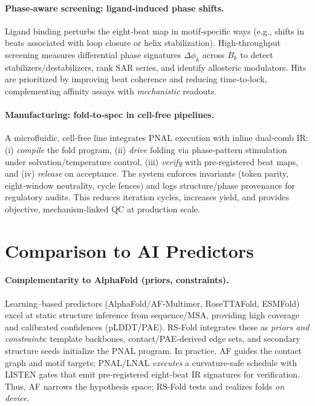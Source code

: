 \documentclass[12pt,a4paper]{article}
\begin{document}
\paragraph{Phase‑aware screening: ligand‑induced phase shifts.}
Ligand binding perturbs the eight‑beat map in motif‑specific ways (e.g., shifts in beats associated with loop closure or helix stabilization). High‑throughput screening measures differential phase signatures $\Delta \phi_k$ across $B_k$ to detect stabilizers/destabilizers, rank SAR series, and identify allosteric modulators. Hits are prioritized by improving beat coherence and reducing time‑to‑lock, complementing affinity assays with \emph{mechanistic} readouts.

\paragraph{Manufacturing: fold‑to‑spec in cell‑free pipelines.}
A microfluidic, cell‑free line integrates PNAL execution with inline dual‑comb IR: (i) \emph{compile} the fold program, (ii) \emph{drive} folding via phase‑pattern stimulation under solvation/temperature control, (iii) \emph{verify} with pre‑registered beat maps, and (iv) \emph{release} on acceptance. The system enforces invariants (token parity, eight‑window neutrality, cycle fences) and logs structure/phase provenance for regulatory audits. This reduces iteration cycles, increases yield, and provides objective, mechanism‑linked QC at production scale.

\section{Comparison to AI Predictors}

\paragraph{Complementarity to AlphaFold (priors, constraints).}
Learning–based predictors (AlphaFold/AF‑Multimer, RoseTTAFold, ESMFold) excel at static structure inference from sequence/MSA, providing high coverage and calibrated confidences (pLDDT/PAE). RS‑Fold integrates these as \emph{priors and constraints}: template backbones, contact/PAE‑derived edge sets, and secondary structure seeds initialize the PNAL program. In practice, AF guides the contact graph and motif targets; PNAL/LNAL \emph{executes} a curvature‑safe schedule with LISTEN gates that emit pre‑registered eight‑beat IR signatures for verification. Thus, AF narrows the hypothesis space; RS‑Fold tests and realizes folds \emph{on device}.
\end{document}
